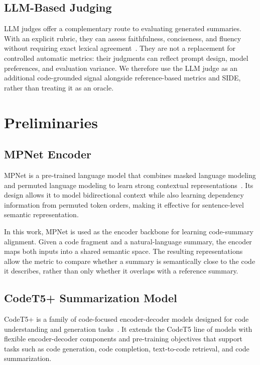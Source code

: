 \documentclass[conference]{IEEEtran}
\begin{document}
\subsection{LLM-Based Judging}

LLM judges offer a complementary route to evaluating generated summaries. With an explicit rubric, they can assess faithfulness, conciseness, and fluency without requiring exact lexical agreement~\cite{liu2023geval,zheng2023judging}. They are not a replacement for controlled automatic metrics: their judgments can reflect prompt design, model preferences, and evaluation variance. We therefore use the LLM judge as an additional code-grounded signal alongside reference-based metrics and SIDE, rather than treating it as an oracle.

\section{Preliminaries}

\subsection{MPNet Encoder}

MPNet is a pre-trained language model that combines masked language modeling and permuted language modeling to learn strong contextual representations~\cite{song2020mpnet}. Its design allows it to model bidirectional context while also learning dependency information from permuted token orders, making it effective for sentence-level semantic representation.

In this work, MPNet is used as the encoder backbone for learning code-summary alignment. Given a code fragment and a natural-language summary, the encoder maps both inputs into a shared semantic space. The resulting representations allow the metric to compare whether a summary is semantically close to the code it describes, rather than only whether it overlaps with a reference summary.

\subsection{CodeT5+ Summarization Model}
CodeT5+ is a family of code-focused encoder-decoder models designed for code understanding and generation tasks~\cite{wang2023codet5plus}. It extends the CodeT5 line of models with flexible encoder-decoder components and pre-training objectives that support tasks such as code generation, code completion, text-to-code retrieval, and code summarization.
\end{document}
